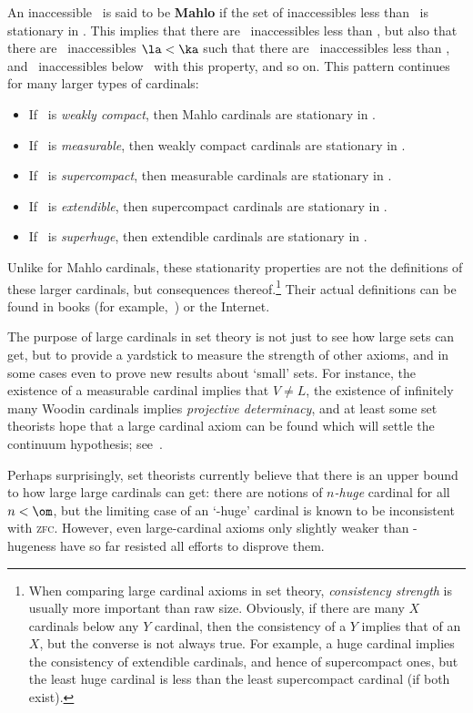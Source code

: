\documentclass[12pt]{amsart}
\def\zfc{\textsc{zfc}}
\begin{document}
An inaccessible \ka\ is said to be \textbf{Mahlo} if the set of
inaccessibles less than \ka\ is stationary in \ka.  This implies that
there are \ka\ inaccessibles less than \ka, but also that there are
\ka\ inaccessibles $\la<\ka$ such that there are \la\ inaccessibles
less than \la, and \ka\ inaccessibles below \ka\ with this property,
and so on.  This pattern continues for many larger types of cardinals:
\begin{itemize}
\item If \ka\ is \emph{weakly compact}, then Mahlo cardinals are
  stationary in \ka.
\item If \ka\ is \emph{measurable}, then weakly compact
  cardinals are stationary in \ka.
\item If \ka\ is \emph{supercompact}, then measurable cardinals are
  stationary in \ka.
\item If \ka\ is \emph{extendible}, then supercompact cardinals are
  stationary in \ka.
\item If \ka\ is \emph{superhuge}, then extendible cardinals are
  stationary in \ka.
\end{itemize}
Unlike for Mahlo cardinals, these stationarity properties are not the
definitions of these larger cardinals, but consequences
thereof.\footnote{When comparing large cardinal axioms in set theory,
  \emph{consistency strength} is usually more important than raw size.
  Obviously, if there are many $X$ cardinals below any $Y$ cardinal,
  then the consistency of a $Y$ implies that of an $X$, but the
  converse is not always true.  For example, a huge cardinal implies
  the consistency of extendible cardinals, and hence of supercompact
  ones, but the least huge cardinal is less than the least
  supercompact cardinal (if both exist).}  Their actual definitions
can be found in books (for
example,~\cite{jech:set-theory,kanamori:higher-infinite}) or the
Internet.

The purpose of large cardinals in set theory is not just to see how
large sets can get, but to provide a yardstick to measure the strength
of other axioms, and in some cases even to prove new results about
`small' sets.  For instance, the existence of a measurable cardinal
implies that $V\neq L$, the existence of infinitely many Woodin
cardinals implies \emph{projective determinacy}, and at least some set
theorists hope that a large cardinal axiom can be found which will
settle the continuum hypothesis;
see~\cite{believing-axioms-i,believing-axioms-ii}.

Perhaps surprisingly, set theorists currently believe that there is an
upper bound to how large large cardinals can get: there are notions of
\emph{$n$-huge} cardinal for all $n<\om$, but the limiting case of an
`\om-huge' cardinal is known to be inconsistent with \zfc.  However,
even large-cardinal axioms only slightly weaker than \om-hugeness have
so far resisted all efforts to disprove them.
\end{document}

